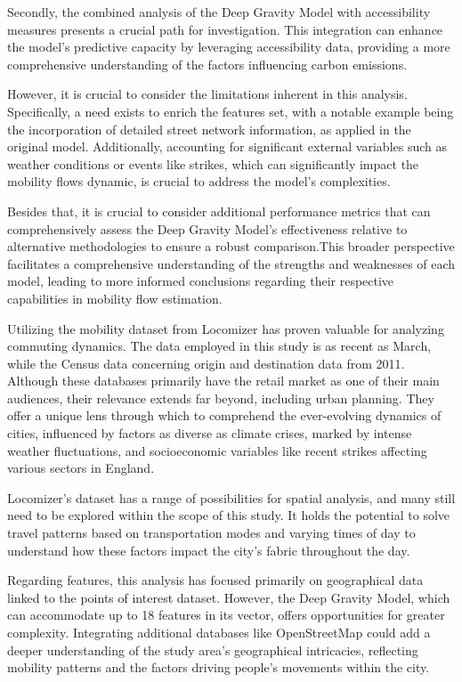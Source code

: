         Secondly, the combined analysis of the Deep Gravity Model with accessibility measures presents a crucial path for investigation. This integration can enhance the model's predictive capacity by leveraging accessibility data, providing a more comprehensive understanding of the factors influencing carbon emissions.
        
        However, it is crucial to consider the limitations inherent in this analysis. Specifically, a need exists to enrich the features set, with a notable example being the incorporation of detailed street network information, as applied in the original model. Additionally, accounting for significant external variables such as weather conditions or events like strikes, which can significantly impact the mobility flows dynamic, is crucial to address the model's complexities.
        
        Besides that, it is crucial to consider additional performance metrics that can comprehensively assess the Deep Gravity Model's effectiveness relative to alternative methodologies to ensure a robust comparison.This broader perspective facilitates a comprehensive understanding of the strengths and weaknesses of each model, leading to more informed conclusions regarding their respective capabilities in mobility flow estimation. 

        Utilizing the mobility dataset from Locomizer has proven valuable for analyzing commuting dynamics. The data employed in this study is as recent as March, while the Census data concerning origin and destination data from 2011. Although these databases primarily have the retail market as one of their main audiences, their relevance extends far beyond, including urban planning. They offer a unique lens through which to comprehend the ever-evolving dynamics of cities, influenced by factors as diverse as climate crises, marked by intense weather fluctuations, and socioeconomic variables like recent strikes affecting various sectors in England.

        Locomizer's dataset has a range of possibilities for spatial analysis, and many still need to be explored within the scope of this study. It holds the potential to solve travel patterns based on transportation modes and varying times of day to understand how these factors impact the city's fabric throughout the day.
        
        Regarding features, this analysis has focused primarily on geographical data linked to the points of interest dataset. However, the Deep Gravity Model, which can accommodate up to 18 features in its vector, offers opportunities for greater complexity. Integrating additional databases like OpenStreetMap could add a deeper understanding of the study area's geographical intricacies, reflecting mobility patterns and the factors driving people's movements within the city.
        
